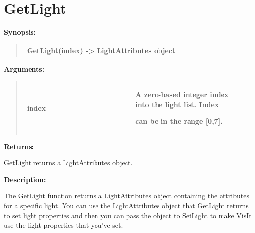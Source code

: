 \documentclass[letterpaper,10pt,english]{sphinxmanual}
\begin{document}
\section{GetLight}
\label{functions:getlight}
\begin{DUlineblock}{0em}
\item[] \textbf{Synopsis:}
\end{DUlineblock}
\begin{quote}

\begin{tabulary}{\linewidth}{|L|}
\hline

GetLight(index) -\textgreater{} LightAttributes object
\\
\hline\end{tabulary}

\end{quote}

\begin{DUlineblock}{0em}
\item[] 
\item[] \textbf{Arguments:}
\end{DUlineblock}
\begin{quote}

\begin{tabular}{|p{0.475\linewidth}|p{0.475\linewidth}|}
\hline

index
 & 
\begin{DUlineblock}{0em}
\item[] A zero-based integer index into the light list. Index
\item[] can be in the range {[}0,7{]}.
\end{DUlineblock}
\\
\hline\end{tabular}

\end{quote}

\begin{DUlineblock}{0em}
\item[] 
\item[] \textbf{Returns:}
\item[] GetLight returns a LightAttributes object.
\item[] 
\item[] \textbf{Description:}
\item[] The GetLight function returns a LightAttributes object containing the
attributes for a specific light. You can use the LightAttributes object
that GetLight returns to set light properties and then you can pass the
object to SetLight to make VisIt use the light properties that you've set.
\end{DUlineblock}
\end{document}
